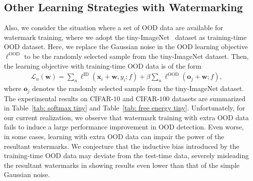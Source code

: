 \documentclass{article}
\begin{document}
\subsection{Other Learning Strategies with Watermarking}

Also, we consider the situation where a set of OOD data are available for watermark training, where we adopt the tiny-ImageNet~\cite{le2015tiny} dataset as training-time OOD dataset. Here, we replace the Gaussian noise in the OOD learning objective $\ell^\text{OOD}$ to be the randomly selected sample from the tiny-ImageNet dataset. Then, the learning objective with training-time OOD data is of the form
\begin{align}
    \mathcal{L}_n(\boldsymbol{w})=\sum_n \ell^\text{ID}(\boldsymbol{x}_i + \boldsymbol{w},y_i;f) + \beta \sum_n \ell^\text{OOD}(\boldsymbol{o}_j+ \boldsymbol{w};f), \label{eq: objective_oe}
\end{align}
where $\boldsymbol{o}_j$ denotes the randomly selected sample from the tiny-ImageNet dataset. The experimental results on CIFAR-$10$ and CIFAR-$100$ datasets are summarized in Table~\ref{tab: softmax tiny} and Table~\ref{tab: free energy tiny}. Unfortunately, for our current realization, we observe that watermark training with extra OOD data fails to induce a large performance improvement in OOD detection. Even worse, in some cases, learning with extra OOD data can impair the power of the resultant watermarks. We conjecture that the inductive bias introduced by the training-time OOD data may deviate from the test-time data, severely misleading the resultant watermarks in showing results even lower than that of the simple Gaussian noise.  
\end{document}
